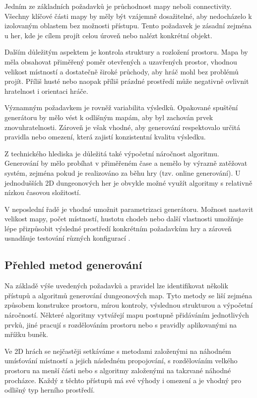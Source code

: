\documentclass[
  program=itk,
  biblatex,
  figures=false,
  glossaries,
  index
]{kidiplom}
\begin{document}
Jedním ze základních požadavků je průchodnost mapy neboli connectivity.
Všechny klíčové části mapy by měly být vzájemně dosažitelné, aby nedocházelo k izolovaným oblastem bez možnosti přístupu.
Tento požadavek je zásadní zejména u her, kde je cílem projít celou úroveň nebo nalézt konkrétní objekt.

Dalším důležitým aspektem je kontrola struktury a rozložení prostoru. Mapa by měla obsahovat přiměřený poměr otevřených a uzavřených prostor, vhodnou velikost místností a dostatečně široké průchody, aby hráč mohl bez problémů projít. Příliš husté nebo naopak příliš prázdné prostředí může negativně ovlivnit hratelnost i orientaci hráče.

Významným požadavkem je rovněž variabilita výsledků. Opakované spuštění generátoru by mělo vést k odlišným mapám, aby byl zachován prvek znovuhratelnosti. Zároveň je však vhodné, aby generování respektovalo určitá pravidla nebo omezení, která zajistí konzistentní kvalitu výsledku.

Z technického hlediska je důležitá také výpočetní náročnost algoritmu. Generování by mělo probíhat v přiměřeném čase a nemělo by výrazně zatěžovat systém, zejména pokud je realizováno za běhu hry (tzv. online generování). U jednodušších 2D dungeonových her je obvykle možné využít algoritmy s relativně nízkou časovou složitostí.

V neposlední řadě je vhodné umožnit parametrizaci generátoru. Možnost nastavit velikost mapy, počet místností, hustotu chodeb nebo další vlastnosti umožňuje lépe přizpůsobit výsledné prostředí konkrétním požadavkům hry a zároveň usnadňuje testování různých konfigurací \cite{Linden2014,Shaker2016}.

\subsection{Přehled metod generování}
Na základě výše uvedených požadavků a pravidel lze identifikovat několik přístupů a algoritmů generování dungeonových map. Tyto metody se liší zejména způsobem konstrukce prostoru, mírou kontroly, výslednou strukturou a výpočetní náročností. Některé algoritmy vytvářejí mapu postupně přidáváním jednotlivých prvků, jiné pracují s rozdělováním prostoru nebo s pravidly aplikovanými na mřížku buněk.

Ve 2D hrách se nejčastěji setkáváme s metodami založenými na náhodném umísťování místností a jejich následném propojování, s rozdělováním velkého prostoru na menší části nebo s algoritmy založenými na takzvané náhodné procházce. Každý z těchto přístupů má své výhody i omezení a je vhodný pro odlišný typ herního prostředí.
\end{document}
